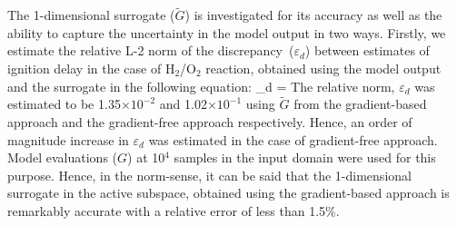 The 1-dimensional surrogate ($\tilde{G}$) is investigated for its accuracy as well as the ability to capture the 
uncertainty in the
model output in two ways. Firstly, we estimate the relative L-2 norm of the discrepancy~($\varepsilon_d$)
between estimates of ignition delay in the case of H$_2$/O$_2$ reaction, obtained using the 
model output and the surrogate in the following equation:
%
\be
\varepsilon_d = 
\ee
%
The relative norm, $\varepsilon_d$ was estimated to be 1.35$\times10^{-2}$ and 1.02$\times10^{-1}$
using $\tilde{G}$ from the gradient-based approach and the gradient-free approach respectively. Hence,
an order of magnitude increase in $\varepsilon_d$ was estimated in the case of gradient-free approach.
Model evaluations ($G$) at 10$^{4}$ samples in the input domain were used for this purpose. 
Hence, in the norm-sense, it can be said that the 1-dimensional surrogate in the active subspace, obtained
using the gradient-based approach is remarkably accurate with a relative error of less than 1.5$\%$.

